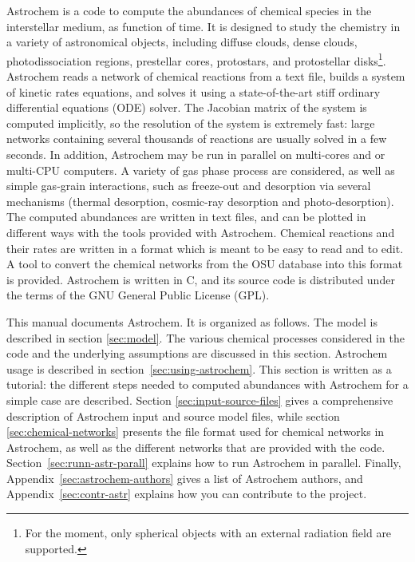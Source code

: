 \documentclass[a4paper,12pt]{article}
\begin{document}
Astrochem is a code to compute the abundances of chemical species in
the interstellar medium, as function of time. It is designed to study
the chemistry in a variety of astronomical objects, including diffuse
clouds, dense clouds, photodissociation regions, prestellar cores,
protostars, and protostellar disks\footnote{For the moment, only
  spherical objects with an external radiation field are
  supported.}. Astrochem reads a network of chemical reactions from a
text file, builds a system of kinetic rates equations, and solves it
using a state-of-the-art stiff ordinary differential equations (ODE)
solver. The Jacobian matrix of the system is computed implicitly, so
the resolution of the system is extremely fast: large networks
containing several thousands of reactions are usually solved in a few
seconds. In addition, Astrochem may be run in parallel on multi-cores
and or multi-CPU computers. A variety of gas phase process are
considered, as well as simple gas-grain interactions, such as
freeze-out and desorption via several mechanisms (thermal desorption,
cosmic-ray desorption and photo-desorption). The computed abundances
are written in text files, and can be plotted in different ways with
the tools provided with Astrochem. Chemical reactions and their rates
are written in a format which is meant to be easy to read and to
edit. A tool to convert the chemical networks from the OSU database
into this format is provided. Astrochem is written in C, and its
source code is distributed under the terms of the GNU General Public
License (GPL).

This manual documents Astrochem. It is organized as follows. The model
is described in section \ref{sec:model}. The various chemical
processes considered in the code and the underlying assumptions are
discussed in this section. Astrochem usage is described in
section~\ref{sec:using-astrochem}. This section is written as a
tutorial: the different steps needed to computed abundances with
Astrochem for a simple case are described. Section
\ref{sec:input-source-files} gives a comprehensive description of
Astrochem input and source model files, while section
\ref{sec:chemical-networks} presents the file format used for chemical
networks in Astrochem, as well as the different networks that are
provided with the code. Section~\ref{sec:runn-astr-parall} explains
how to run Astrochem in parallel. Finally,
Appendix~\ref{sec:astrochem-authors} gives a list of Astrochem
authors, and Appendix~\ref{sec:contr-astr} explains how you can
contribute to the project.
\end{document}
